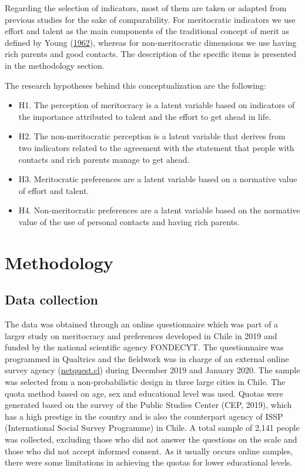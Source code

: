 \documentclass[
]{article}
\begin{document}
Regarding the selection of indicators, most of them are taken or adapted from previous studies for the sake of comparability. For meritocratic indicators we use effort and talent as the main components of the traditional concept of merit as defined by Young (\protect\hyperlink{ref-young_rise_1962}{1962}), whereas for non-meritocratic dimensions we use having rich parents and good contacts. The description of the specific items is presented in the methodology section.

The research hypotheses behind this conceptualization are the following:

\begin{itemize}
\item
  H1. The perception of meritocracy is a latent variable based on indicators of the importance attributed to talent and the effort to get ahead in life.
\item
  H2. The non-meritocratic perception is a latent variable that derives from two indicators related to the agreement with the statement that people with contacts and rich parents manage to get ahead.
\item
  H3. Meritocratic preferences are a latent variable based on a normative value of effort and talent.
\item
  H4. Non-meritocratic preferences are a latent variable based on the normative value of the use of personal contacts and having rich parents.
\end{itemize}

\hypertarget{methodology}{%
\section{Methodology}\label{methodology}}

\hypertarget{data}{%
\subsection*{Data collection}\label{data}}

The data was obtained through an online questionnaire which was part of a larger study on meritocracy and preferences developed in Chile in 2019 and funded by the national scientific agency FONDECYT. The questionnaire was programmed in Qualtrics and the fieldwork was in charge of an external online survey agency (\href{www.netquest.cl}{netquest.cl}) during December 2019 and January 2020. The sample was selected from a non-probabilistic design in three large cities in Chile. The quota method based on age, sex and educational level was used. Quotas were generated based on the survey of the Public Studies Center (CEP, 2019), which has a high prestige in the country and is also the counterpart agency of ISSP (International Social Survey Programme) in Chile. A total sample of 2,141 people was collected, excluding those who did not answer the questions on the scale and those who did not accept informed consent. As it usually occurs online samples, there were some limitations in achieving the quotas for lower educational levels.
\end{document}
